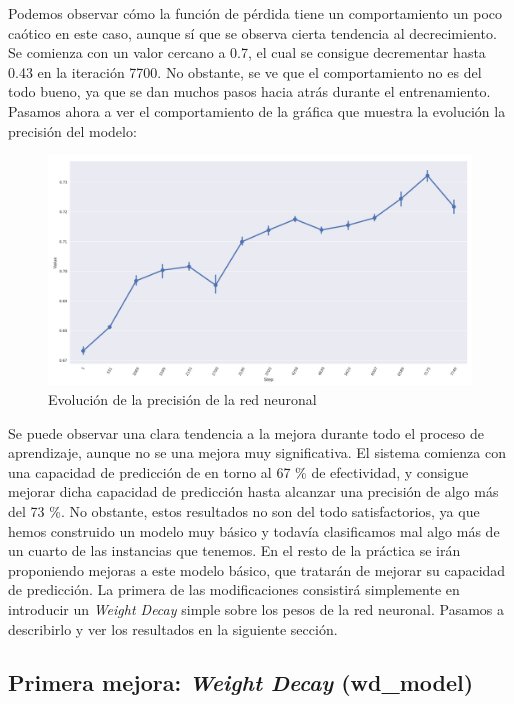 \documentclass[11pt]{article}
\theoremstyle{plain}
\theoremstyle{definition}
\begin{document}
Podemos observar cómo la función de pérdida tiene un comportamiento un
poco caótico en este caso, aunque sí que se observa cierta tendencia
al decrecimiento. Se comienza con un valor cercano a 0.7, el cual se
consigue decrementar hasta 0.43 en la iteración 7700. No obstante, se
ve que el comportamiento no es del todo bueno, ya que se dan muchos
pasos hacia atrás durante el entrenamiento. Pasamos ahora a ver el
comportamiento de la gráfica que muestra la evolución la precisión del
modelo:

\begin{figure}[H]
  \centering \includegraphics[width=.95\textwidth]{imgs/accuracy_base}
  \caption{Evolución de la precisión de la red neuronal}
\end{figure}

Se puede observar una clara tendencia a la mejora durante todo el
proceso de aprendizaje, aunque no se una mejora muy significativa. El
sistema comienza con una capacidad de predicción de en torno al 67 \%
de efectividad, y consigue mejorar dicha capacidad de predicción hasta
alcanzar una precisión de algo más del 73 \%. No obstante, estos
resultados no son del todo satisfactorios, ya que hemos construido un
modelo muy básico y todavía clasificamos mal algo más de un cuarto
de las instancias que tenemos. En el resto de la práctica se irán
proponiendo mejoras a este modelo básico, que tratarán de mejorar
su capacidad de predicción. La primera de las modificaciones consistirá
simplemente en introducir un \textit{Weight Decay} simple sobre los
pesos de la red neuronal. Pasamos a describirlo y ver los resultados
en la siguiente sección.

\subsection{Primera mejora: \textit{Weight Decay} (wd\_model)}
\end{document}
